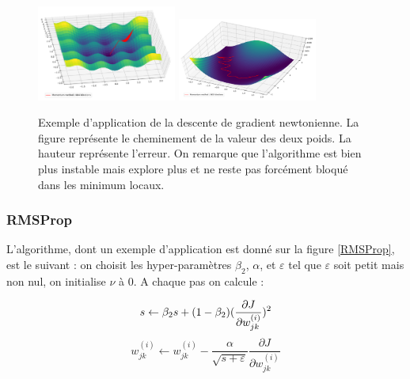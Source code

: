 \begin{figure}[!h]
\centering
\includegraphics[width=130pt]{"images/MLP/descentedegradientnewtonnienne"}
\hspace*{10mm}
\includegraphics[width=130pt]{"images/MLP/descentedegradientnewtonniennepropre"}
\caption{Exemple d'application de la descente de gradient newtonienne. La figure représente le cheminement de la valeur des deux poids. La hauteur représente l'erreur. On remarque que l'algorithme est bien plus instable mais explore plus et ne reste pas forcément bloqué dans les minimum locaux.}
\label{descentedegradientnewtonnienne}
\end{figure}

\subsubsection{RMSProp}
L'algorithme, dont un exemple d'application est donné sur la figure \ref{RMSProp}, est le suivant : on choisit les hyper-paramètres $\beta_2$, $\alpha$, et $\varepsilon$ tel que $\varepsilon$ soit petit mais non nul, on initialise $\nu$ à 0.
A chaque pas on calcule :

\begin{displaymath}
s \leftarrow \beta_2 s + (1-\beta_2)  (\frac{\partial J}{\partial w_{jk}^{(i)}})^2 \\
\end{displaymath}
\begin{displaymath}
w_{jk}^{(i)} \leftarrow w_{jk}^{(i)} - \frac{\alpha}{\sqrt{s+\varepsilon}}\frac{\partial J}{\partial w_{jk}^{(i)}}
\end{displaymath}

